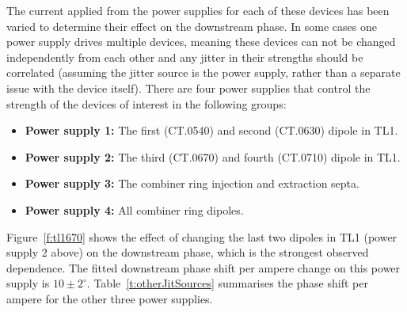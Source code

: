 The current applied from the power supplies for each of these devices has been varied to determine their effect on the downstream phase. In some cases one power supply drives multiple devices, meaning these devices can not be changed independently from each other and any jitter in their strengths should be correlated (assuming the jitter source is the power supply, rather than a separate issue with the device itself). There are four power supplies that control the strength of the devices of interest in the following groups:
\begin{itemize}
\item \textbf{Power supply 1:} The first (CT.0540) and second (CT.0630) dipole in TL1.
\item \textbf{Power supply 2:} The third (CT.0670) and fourth (CT.0710) dipole in TL1.
\item \textbf{Power supply 3:} The combiner ring injection and extraction septa.
\item \textbf{Power supply 4:} All combiner ring dipoles.
\end{itemize}

Figure~\ref{f:tl1670} shows the effect of changing the last two dipoles in TL1 (power supply 2 above) on the downstream phase, which is the strongest observed dependence. The fitted downstream phase shift per ampere change on this power supply is \(10\pm2^\circ\). Table~\ref{t:otherJitSources} summarises the phase shift per ampere for the other three power supplies. 


